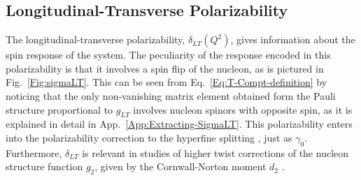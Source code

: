 \documentclass[twocolumn,prc,showpacs,nofootinbib,preprintnumbers,amsmath,amssymb,superscriptaddress]{revtex4-1}
\begin{document}
\subsection{Longitudinal-Transverse Polarizability}
\label{Sec:LongitudinalTransversePolarizability}

The longitudinal-transverse polarizability, $\delta_{LT}(Q^2)$, gives information about the spin response of the system.
The peculiarity of the response encoded in this polarizability is that it involves a spin flip of the nucleon, as is pictured in Fig.~\ref{Fig:sigmaLT}.
This can be seen from Eq.~\eqref{Eq:T-Compt-definition} by noticing that the only non-vanishing matrix element obtained form the Pauli structure proportional to $g_{LT}$ involves nucleon spinors with opposite spin, as it is explained in detail in App.~\ref{App:Extracting-SigmaLT}.
This polarizability enters into the polarizability correction to the hyperfine splitting \cite{Carlson:2008ke}, just as $\gamma_0$. Furthermore, $\delta_{LT}$ is relevant in studies of higher twist corrections of the nucleon structure function $g_2$, given by the Cornwall-Norton moment $d_2$ \cite{Kao:2003jd}.
\end{document}
